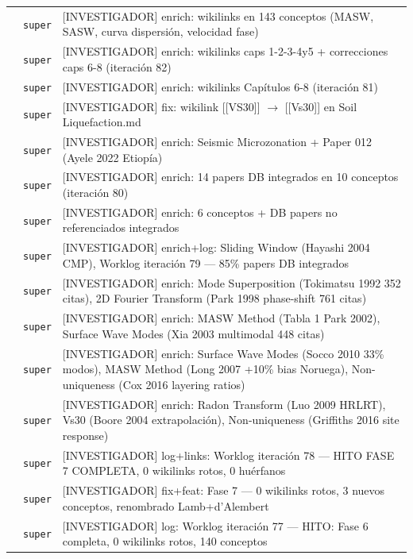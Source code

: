 \begin{longtable}{@{}p{1.7cm} p{1.5cm} p{12.2cm}@{}}
 & \texttt{\scriptsize super} & [INVESTIGADOR] enrich: wikilinks en 143 conceptos (MASW, SASW, curva dispersión, velocidad fase) \\
 & \texttt{\scriptsize super} & [INVESTIGADOR] enrich: wikilinks caps 1-2-3-4y5 + correcciones caps 6-8 (iteración 82) \\
 & \texttt{\scriptsize super} & [INVESTIGADOR] enrich: wikilinks Capítulos 6-8 (iteración 81) \\
 & \texttt{\scriptsize super} & [INVESTIGADOR] fix: wikilink [[VS30]] $\rightarrow$ [[Vs30]] en Soil Liquefaction.md \\
 & \texttt{\scriptsize super} & [INVESTIGADOR] enrich: Seismic Microzonation + Paper 012 (Ayele 2022 Etiopía) \\
 & \texttt{\scriptsize super} & [INVESTIGADOR] enrich: 14 papers DB integrados en 10 conceptos (iteración 80) \\
 & \texttt{\scriptsize super} & [INVESTIGADOR] enrich: 6 conceptos + DB papers no referenciados integrados \\
 & \texttt{\scriptsize super} & [INVESTIGADOR] enrich+log: Sliding Window (Hayashi 2004 CMP), Worklog iteración 79 --- 85\% papers DB integrados \\
 & \texttt{\scriptsize super} & [INVESTIGADOR] enrich: Mode Superposition (Tokimatsu 1992 352 citas), 2D Fourier Transform (Park 1998 phase-shift 761 citas) \\
 & \texttt{\scriptsize super} & [INVESTIGADOR] enrich: MASW Method (Tabla 1 Park 2002), Surface Wave Modes (Xia 2003 multimodal 448 citas) \\
 & \texttt{\scriptsize super} & [INVESTIGADOR] enrich: Surface Wave Modes (Socco 2010 33\% modos), MASW Method (Long 2007 +10\% bias Noruega), Non-uniqueness (Cox 2016 layering ratios) \\
 & \texttt{\scriptsize super} & [INVESTIGADOR] enrich: Radon Transform (Luo 2009 HRLRT), Vs30 (Boore 2004 extrapolación), Non-uniqueness (Griffiths 2016 site response) \\
 & \texttt{\scriptsize super} & [INVESTIGADOR] log+links: Worklog iteración 78 --- HITO FASE 7 COMPLETA, 0 wikilinks rotos, 0 huérfanos \\
 & \texttt{\scriptsize super} & [INVESTIGADOR] fix+feat: Fase 7 --- 0 wikilinks rotos, 3 nuevos conceptos, renombrado Lamb+d'Alembert \\
 & \texttt{\scriptsize super} & [INVESTIGADOR] log: Worklog iteración 77 --- HITO: Fase 6 completa, 0 wikilinks rotos, 140 conceptos \\

\end{longtable}
